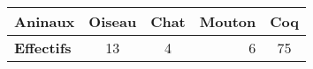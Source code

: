 \documentclass[a4paper,12pt]{report}
\begin{document}
\begin{tabular}{|l|c|c|r|c|}
\hline \textbf{Aninaux} & Oiseau & Chat & Mouton & Coq \\
\hline \textbf{Effectifs} & 13 & 4 & 6 & 75\\
\hline
\end{tabular}
\end{document}
